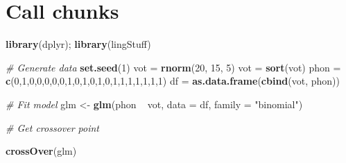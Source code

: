 \documentclass[11pt,report]{uncdissertation}
\newenvironment{Shaded}{\begin{snugshade}}{\end{snugshade}}
\newcommand{\KeywordTok}[1]{\textcolor[rgb]{0.13,0.29,0.53}{\textbf{{#1}}}}
\newcommand{\DataTypeTok}[1]{\textcolor[rgb]{0.13,0.29,0.53}{{#1}}}
\newcommand{\DecValTok}[1]{\textcolor[rgb]{0.00,0.00,0.81}{{#1}}}
\newcommand{\StringTok}[1]{\textcolor[rgb]{0.31,0.60,0.02}{{#1}}}
\newcommand{\CommentTok}[1]{\textcolor[rgb]{0.56,0.35,0.01}{\textit{{#1}}}}
\newcommand{\NormalTok}[1]{{#1}}
\begin{document}
\section{Call chunks}\label{call-chunks}

\begin{Shaded}
\begin{Highlighting}[]
\KeywordTok{library}\NormalTok{(dplyr); }\KeywordTok{library}\NormalTok{(lingStuff)}
\end{Highlighting}
\end{Shaded}

\begin{Shaded}
\begin{Highlighting}[]
\CommentTok{# Generate data}
\KeywordTok{set.seed}\NormalTok{(}\DecValTok{1}\NormalTok{)}
\NormalTok{vot =}\StringTok{ }\KeywordTok{rnorm}\NormalTok{(}\DecValTok{20}\NormalTok{, }\DecValTok{15}\NormalTok{, }\DecValTok{5}\NormalTok{)}
\NormalTok{vot =}\StringTok{ }\KeywordTok{sort}\NormalTok{(vot)}
\NormalTok{phon =}\StringTok{ }\KeywordTok{c}\NormalTok{(}\DecValTok{0}\NormalTok{,}\DecValTok{1}\NormalTok{,}\DecValTok{0}\NormalTok{,}\DecValTok{0}\NormalTok{,}\DecValTok{0}\NormalTok{,}\DecValTok{0}\NormalTok{,}\DecValTok{0}\NormalTok{,}\DecValTok{1}\NormalTok{,}\DecValTok{0}\NormalTok{,}\DecValTok{1}\NormalTok{,}\DecValTok{0}\NormalTok{,}\DecValTok{1}\NormalTok{,}\DecValTok{0}\NormalTok{,}\DecValTok{1}\NormalTok{,}\DecValTok{1}\NormalTok{,}\DecValTok{1}\NormalTok{,}\DecValTok{1}\NormalTok{,}\DecValTok{1}\NormalTok{,}\DecValTok{1}\NormalTok{,}\DecValTok{1}\NormalTok{)}
\NormalTok{df =}\StringTok{ }\KeywordTok{as.data.frame}\NormalTok{(}\KeywordTok{cbind}\NormalTok{(vot, phon))}
\end{Highlighting}
\end{Shaded}

\begin{Shaded}
\begin{Highlighting}[]
\CommentTok{# Fit model}
\NormalTok{glm <-}\StringTok{ }\KeywordTok{glm}\NormalTok{(phon ~}\StringTok{ }\NormalTok{vot, }\DataTypeTok{data =} \NormalTok{df, }\DataTypeTok{family =} \StringTok{"binomial"}\NormalTok{)}
\end{Highlighting}
\end{Shaded}

\begin{Shaded}
\begin{Highlighting}[]
\CommentTok{# Get crossover point}

\KeywordTok{crossOver}\NormalTok{(glm)}
\end{Highlighting}
\end{Shaded}
\end{document}
